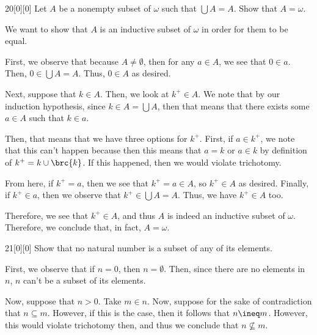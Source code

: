 \documentclass{article}
\begin{document}
\begin{hw}{20}[0][0]
	Let $A$ be a nonempty subset of $\omega$ such that $\bigcup A = A$. Show that $A = \omega$.
\end{hw}
\begin{solution}
	We want to show that $A$ is an inductive subset of $\omega$ in order for them to be equal.
	
	First, we observe that because $A \neq \emptyset$, then for any $a \in A$, we see that $0 \in a$. Then, $0 \in \bigcup A = A$. Thus, $0 \in A$ as desired.
	
	Next, suppose that $k \in A$. Then, we look at $k^{+} \in A$. We note that by our induction hypothesis, since $k \in A = \bigcup A$, then that means that there exists some $a \in A$ such that $k \in a$.
	
	Then, that means that we have three options for $k^{+}$. First, if $a \in k^{+}$, we note that this can't happen because then this means that $a = k$ or $a \in k$ by definition of $k^{+} = k \cup \brc{k}$. If this happened, then we would violate trichotomy. 
	
	From here, if $k^{+} = a$, then we see that $k^{+} = a \in A$, so $k^{+} \in A$ as desired. Finally, if $k^{+} \in a$, then we observe that $k^{+} \in \bigcup A = A$. Thus, we have $k^{+} \in A$ too.
	
	Therefore, we see that $k^{+} \in A$, and thus $A$ is indeed an inductive subset of $\omega$. Therefore, we conclude that, in fact, $A = \omega$.
\end{solution}

\begin{hw}{21}[0][0]
	Show that no natural number is a subset of any of its elements.
\end{hw}
\begin{solution}
	First, we observe that if $n = 0$, then $n = \emptyset$. Then, since there are no elements in $n$, $n$ can't be a subset of its elements.
	
	Now, suppose that $n > 0$. Take $m \in n$. Now, suppose for the sake of contradiction that $n \subseteq m$. However, if this is the case, then it follows that $n \ineq m$. However, this would violate trichotomy then, and thus we conclude that $n \not\subseteq m$.
\end{solution}
\end{document}
